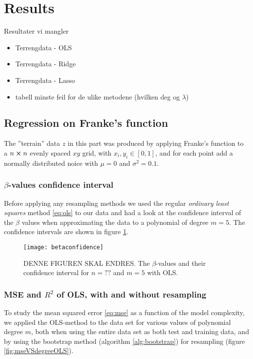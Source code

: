 \section{Results}
\label{sec:results}
Resultater vi mangler
\begin{itemize}
\item Terrengdata - OLS
\item Terrengdata - Ridge
\item Terrengdata - Lasso
\item tabell minste feil for de ulike metodene (hvilken deg og $\lambda$)
\end{itemize}
\subsection{Regression on Franke's function}
The {''}terrain'' data $z$ in this part was produced by applying Franke's function to a $n\cross n$ evenly spaced $xy$ grid, with $x_i,y_i\in [0,1]$, and for each point add a normally distributed noice with $\mu = 0$ and $\sigma^2 = 0.1$.
\subsubsection{$\beta$-values confidence interval}
Before applying any resampling methods we used the regular \emph{ordinary least squares} method \eqref{eq:ols} to our data and had a look at the confidence interval of the $\beta$ values when approximating the data to a polynomial of degree $m=5$. The confidence intervals are shown in figure \ref{fig:betaconfidence}.

\begin{figure}[htbp]
	\centering
	\texttt{[image: betaconfidence]}
	\caption{DENNE FIGUREN SKAL ENDRES. The $\beta$-values and their confidence interval for $n=??$ and $m=5$ with OLS.}
	\label{fig:betaconfidence}
\end{figure}

\subsubsection{MSE and $R^2$ of OLS, with and without resampling}
To study the mean squared error \eqref{eq:mse} as a function of the model complexity, we applied the OLS-method to the data set for various values of polynomial degree $m$, both when using the entire data set as both test and training data, and by using the bootstrap method (algorithm \ref{alg:bootstrap}) for resampling (figure \ref{fig:mseVSdegreeOLS}).

